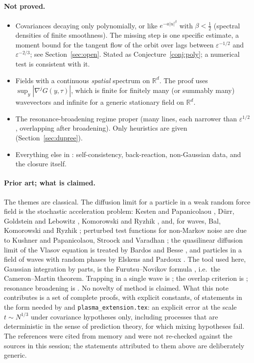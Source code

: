 \documentclass[11pt]{article}
\newcommand{\eps}{\varepsilon}
\theoremstyle{remark}
\begin{document}
\paragraph{Not proved.}
\begin{itemize}
  \item Covariances decaying only polynomially, or like $e^{-a|u|^\beta}$
    with $\beta<\frac12$ (spectral densities of finite smoothness). The
    missing step is one specific estimate, a moment bound for the tangent
    flow of the orbit over lags between $\eps^{-1/2}$ and $\eps^{-2/3}$; see
    Section~\ref{sec:open}. Stated as Conjecture~\ref{conj:poly}; a numerical
    test is consistent with it.
  \item Fields with a continuous \emph{spatial} spectrum on $\mathbb{R}^d$.
    The proof uses $\sup_y|\nabla^jG(y,\tau)|$, which is finite for finitely
    many (or summably many) wavevectors and infinite for a generic
    stationary field on $\mathbb{R}^d$.
  \item The resonance-broadening regime proper (many lines, each narrower
    than $\eps^{1/2}$, overlapping after broadening). Only heuristics are
    given (Section~\ref{sec:dupree}).
  \item Everything else in \cite[Section~8]{Note}: self-consistency,
    back-reaction, non-Gaussian data, and the closure itself.
\end{itemize}

\paragraph{Prior art; what is claimed.} The themes are classical. The
diffusion limit for a particle in a weak random force field is the
stochastic acceleration problem: Kesten and Papanicolaou \cite{KP}, D\"urr,
Goldstein and Lebowitz \cite{DGL}, Komorowski and Ryzhik \cite{KR}, and, for
waves, Bal, Komorowski and Ryzhik \cite{BKR}; perturbed test functions for
non-Markov noise are due to Kushner \cite{Kushner} and Papanicolaou, Stroock
and Varadhan \cite{PSV}; the quasilinear diffusion limit of the Vlasov
equation is treated by Bardos and Besse \cite{BardosBesse}, and particles in
a field of waves with random phases by Elskens and Pardoux
\cite{ElskensPardoux}. The tool used here, Gaussian integration by parts, is
the Furutsu--Novikov formula \cite{Furutsu,Novikov}, i.e.\ the
Cameron--Martin theorem. Trapping in a single wave is \cite{ONeil65}; the
overlap criterion is \cite{Chirikov}; resonance broadening is \cite{Dupree}.
No novelty of method is claimed. What this note contributes is a set of
complete proofs, with explicit constants, of statements in the form needed
by \cite{Note} and \texttt{plasma\_extension.tex}: an explicit error at the
scale $t\sim N^{1/3}$ under covariance hypotheses only, including processes
that are deterministic in the sense of prediction theory, for which mixing
hypotheses fail. The references were cited from memory and were not
re-checked against the sources in this session; the statements attributed to
them above are deliberately generic.
\end{document}
